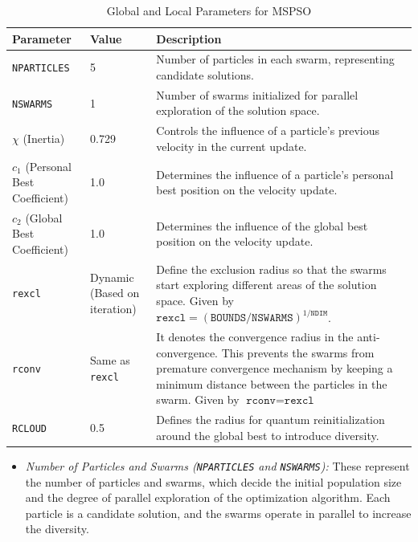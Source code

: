 \begin{itemize}
    \begin{table}[H]
        \centering
        \renewcommand{\arraystretch}{1.5} %
        \begin{tabularx}{\textwidth}{|p{3cm}|p{2cm}|>{\raggedright\arraybackslash}X|}
            \hline
            \textbf{Parameter} & \textbf{Value} & \textbf{Description} \\ \hline
            \texttt{NPARTICLES} & 5 & Number of particles in each swarm, representing candidate solutions. \\ \hline
            \texttt{NSWARMS} & 1 & Number of swarms initialized for parallel exploration of the solution space. \\ \hline
            \(\chi\) (Inertia) & 0.729 & Controls the influence of a particle's previous velocity in the current update. \\ \hline
            \(c_1\) (Personal Best Coefficient) & 1.0 & Determines the influence of a particle's personal best position on the velocity update. \\ \hline
            \(c_2\) (Global Best Coefficient) & 1.0 & Determines the influence of the global best position on the velocity update. \\ \hline
            \texttt{rexcl} & Dynamic (Based on iteration) & Define the exclusion radius so that the swarms start exploring different areas of the solution space. Given by \( \texttt{rexcl} = (\texttt{BOUNDS} / \texttt{NSWARMS})^{1 / \texttt{NDIM}} \). \\ \hline
            \texttt{rconv} & Same as \texttt{rexcl} & It denotes the convergence radius in the anti-convergence. This prevents the swarms from premature convergence mechanism by keeping a minimum distance between the particles in the swarm. Given by \( \texttt{rconv} = \texttt{rexcl} \) \\ \hline
            \texttt{RCLOUD} & 0.5 & Defines the radius for quantum reinitialization around the global best to introduce diversity. \\ \hline
        \end{tabularx}
        \caption{Global and Local Parameters for MSPSO}
        \label{tab:global_local_parameters}
    \end{table}
    

\begin{itemize}
    \item \textit{Number of Particles and Swarms (\texttt{NPARTICLES} and \texttt{NSWARMS}):} These represent the number of particles and swarms, which decide the initial population size and the degree of parallel exploration of the optimization algorithm. Each particle is a candidate solution, and the swarms operate in parallel to increase the diversity.
    

\end{itemize}
\end{itemize}
